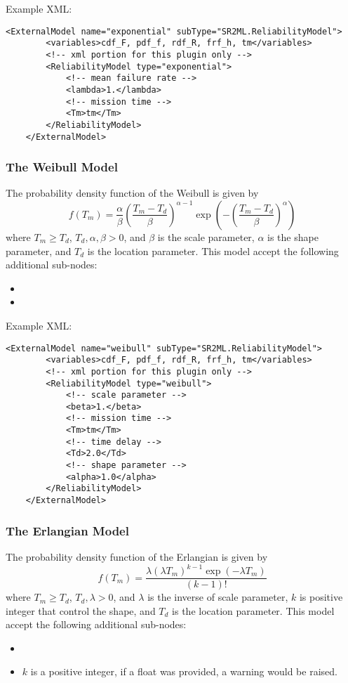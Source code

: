 Example XML:
\begin{lstlisting}[style=XML]
	<ExternalModel name="exponential" subType="SR2ML.ReliabilityModel">
		<variables>cdf_F, pdf_f, rdf_R, frf_h, tm</variables>
		<!-- xml portion for this plugin only -->
		<ReliabilityModel type="exponential">
			<!-- mean failure rate -->
			<lambda>1.</lambda>
			<!-- mission time -->
			<Tm>tm</Tm>
		</ReliabilityModel>
	</ExternalModel>
\end{lstlisting}

\subsubsection{The Weibull Model}
The probability density function of the Weibull is given by
\begin{equation}
	f(T_m) = \frac{\alpha}{\beta}\left(\frac{T_m-T_d}{\beta}\right)^{\alpha-1}\exp\left(-\left(\frac{T_m-T_d}{\beta}\right)^\alpha\right)
\end{equation}
where $T_m\geq T_d$, $T_d, \alpha, \beta >0$, and $\beta$ is the scale parameter, $\alpha$ is the shape
parameter, and $T_d$ is the location parameter.
This model accept the following additional sub-nodes:
\begin{itemize}
	\item {}
	\item {}
\end{itemize}

Example XML:
\begin{lstlisting}[style=XML]
	<ExternalModel name="weibull" subType="SR2ML.ReliabilityModel">
		<variables>cdf_F, pdf_f, rdf_R, frf_h, tm</variables>
		<!-- xml portion for this plugin only -->
		<ReliabilityModel type="weibull">
			<!-- scale parameter -->
			<beta>1.</beta>
			<!-- mission time -->
			<Tm>tm</Tm>
			<!-- time delay -->
			<Td>2.0</Td>
			<!-- shape parameter -->
			<alpha>1.0</alpha>
		</ReliabilityModel>
	</ExternalModel>
\end{lstlisting}

\subsubsection{The Erlangian Model}
The probability density function of the Erlangian is given by
\begin{equation}
	f(T_m) = \frac{\lambda\left(\lambda T_m\right)^{k-1}\exp\left(-\lambda T_m\right)}{\left(k-1\right)!}
\end{equation}
where $T_m\geq T_d$, $T_d, \lambda >0$, and $\lambda$ is the inverse of scale parameter, $k$ is positive integer
that control the shape, and $T_d$ is the location parameter.
This model accept the following additional sub-nodes:
\begin{itemize}
	\item {}
	\item {}
	\nb $k$ is a positive integer, if a float was provided, a warning would be raised.
\end{itemize}


